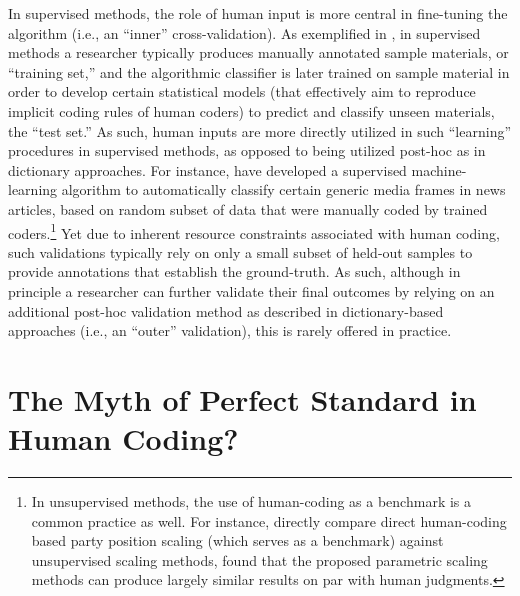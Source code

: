 \documentclass[man, 12pt, a4paper, nolmodern, noextraspace]{apa6}
\begin{document}
    In supervised methods, the role of human input is more central in fine-tuning the algorithm (i.e., an \enquote{inner} cross-validation). As exemplified in \textcite{scharkow2013thematic}, in supervised methods a researcher typically produces manually annotated sample materials, or \enquote{training set,} and the algorithmic classifier is later trained on sample material in order to develop certain statistical models (that effectively aim to reproduce implicit coding rules of human coders) to predict and classify unseen materials, the \enquote{test set.} As such, human inputs are more directly utilized in such \enquote{learning} procedures in supervised methods, as opposed to being utilized post-hoc as in dictionary approaches. For instance, \textcite{burscher2014teaching} have developed a supervised machine-learning algorithm to automatically classify certain generic media frames in news articles, based on random subset of data that were manually coded by trained coders.\footnote{In unsupervised methods, the use of human-coding as a benchmark is a common practice as well. For instance, \textcite{lowe2013validating} directly compare direct human-coding based party position scaling (which serves as a benchmark) against unsupervised scaling methods, found that the proposed parametric scaling methods can produce largely similar results on par with human judgments.} Yet due to inherent resource constraints associated with human coding, such validations typically rely on only a small subset of held-out samples to provide annotations that establish the ground-truth. As such, although in principle a researcher can further validate their final outcomes by relying on an additional post-hoc validation method as described in dictionary-based approaches (i.e., an \enquote{outer} validation), this is rarely offered in practice.   
    
\section{The Myth of Perfect Standard in Human Coding?}
\end{document}
